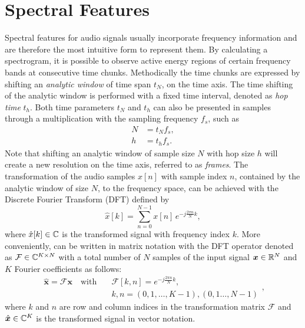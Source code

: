 
\section{Spectral Features}\label{sec:signal_spec}
Spectral features for audio signals usually incorporate frequency information and are therefore the most intuitive form to represent them.
By calculating a spectrogram, it is possible to observe active energy regions of certain frequency bands at consecutive time chunks.
Methodically the time chunks are expressed by shifting an \emph{analytic window} of time span $t_N$, on the time axis.
The time shifting of the analytic window is performed with a fixed time interval, denoted as \emph{hop time} $t_{h}$.
Both time parameters $t_N$ and $t_h$ can also be presented in samples through a multiplication with the sampling frequency $f_s$, such as
\begin{equation}
  \begin{split}
    N &= t_N f_s, \\
    h &= t_h f_s.
  \end{split}
\end{equation}
Note that shifting an analytic window of sample size $N$ with hop size $h$ will create a new resolution on the time axis, referred to as \emph{frames}.
The transformation of the audio samples $x[n]$ with sample index $n$, contained by the analytic window of size $N$, to the frequency space, can be achieved with the Discrete Fourier Transform (DFT) defined by
\begin{equation}\label{eq:signal_spec_dtft}
  \hat{x}[k] = \sum_{n=0}^{N-1} x[n] \, e^{-j\frac{2 \pi n}{N}k},
\end{equation}
where $\hat{x}[k] \in \mathbb{C}$ is the transformed signal with frequency index $k$.
More conveniently,  can be written in matrix notation with the DFT operator denoted as $\mathcal{F} \in \mathbb{C}^{K \times N}$ with a total number of $N$ samples of the input signal $\bm{x} \in \mathbb{R}^N$ and $K$ Fourier coefficients as follows:
\begin{equation}\label{eq:signal_spec_dtft_matrix}
  \begin{aligned}
    \hat{\bm{x}} = \mathcal{F} \bm{x} \quad \mathrm{with} 
    \quad &\mathcal{F}[k, n] = e^{-j\frac{2 \pi n}{N} k},\\
    &k, n = (0, 1, \dots, K-1), (0, 1 \dots, N-1)
  \end{aligned},
\end{equation}
where $k$ and $n$ are row and column indices in the transformation matrix $\mathcal{F}$ and $\hat{\bm{x}} \in \mathbb{C}^K$ is the transformed signal in vector notation.


